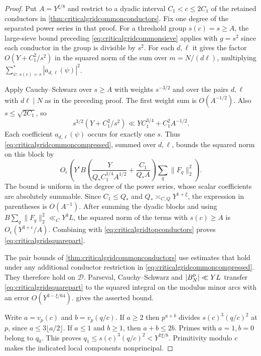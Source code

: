 \documentclass[11pt,a4paper]{article}
\numberwithin{equation}{section}
\begin{document}
\begin{proof}
Put $A=Y^{\xi/8}$ and restrict to a dyadic interval
$C_1<c\le2C_1$ of the retained conductors in
\cref{thm:criticalgridcommonconductors}.
Fix one degree of the separated power series in that proof.
For a threshold group $s(c)=s\ge A$, the large-sieve bound
preceding \cref{eq:criticalgridcommonsieve} applies with
$g=s^2$ since each conductor in the group is divisible by $s^2$.
For each $d,\ell$ it gives the factor $O(Y+C_1^2/s^2)$ in the
squared norm of the sum over $m=N/(d\ell)$, multiplying
$\sum_{\psi:\,s(c)=s}^*|a_{d,\ell}(\psi)|^2$.

Apply Cauchy--Schwarz over $s\ge A$ with weights $s^{-3/2}$
and over the pairs $d,\ell$ with $d\ell\mid N$ as in the preceding
proof. The first weight sum is $O(A^{-1/2})$. Also
$s\le\sqrt{2C_1}$, so
\[
 s^{3/2}(Y+C_1^2/s^2)
 \ll Y C_1^{3/4}+C_1^2 A^{-1/2}.
\]
Each coefficient $a_{d,\ell}(\psi)$ occurs for exactly one
$s$. Thus \cref{eq:criticalgridcommoncompressed}, summed over
$d,\ell$, bounds the squared norm on this block by
\[
 O_\epsilon\!\left(
 Y^\epsilon B\left(\frac{Y}{Q_* C_1^{1/4} A^{1/2}}
                    +\frac{C_1}{Q_* A}\right)\sum_q\|F_q\|_2^2
 \right).
\]
The bound is uniform in the degree of the power series, whose
scalar coefficients are absolutely summable. Since
$C_1\le Q_*$ and $Q_*\asymp_{C,Q}Y^{1+\xi}$, the expression
in parentheses is $O(A^{-1})$. After summing the dyadic
blocks and using $B\sum_q\|F_q\|_2^2\ll_C Y^3 L$,
the squared norm of the terms with $s(c)\ge A$ is
$O_\epsilon(Y^{3+\epsilon}/A)$. Combining with
\cref{eq:criticalgridtopconductors} proves
\cref{eq:criticalgridsquarepart}.

The pair bounds of \cref{thm:criticalgridcommonconductors}
use estimates that hold under any additional conductor
restriction in \cref{eq:criticalgridcommoncompressed}.
They therefore hold on $\mathcal D$. Parseval,
Cauchy--Schwarz and $|B_N^{\rm p}|\ll YL$ transfer
\cref{eq:criticalgridsquarepart} to the squared integral on the
modulus minor arcs with an error $O(Y^{3-\xi/64})$.
 gives the asserted bound.

Write $a=v_p(c)$ and $b=v_p(q/c)$. If $a\ge2$ then
$p^{a+b}$ divides $s(c)^3(q/c)^2$ at $p$, since
$a\le3\lfloor a/2\rfloor$. If $a\le1$ and $b\ge1$, then
$a+b\le2b$. Primes with $a=1,b=0$ belong to $q_0$.
This proves $q_1\le s(c)^3(q/c)^2<Y^{7\xi/8}$.
Primitivity modulo $c$ makes the indicated local components
nonprincipal.
\end{proof}
\end{document}

